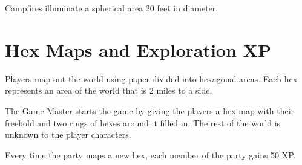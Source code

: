 \begin{multicols}{2}
Campfires illuminate a spherical area 20 feet in diameter.

\section{Hex Maps and Exploration XP}

Players map out the world using paper divided into hexagonal areas. Each hex
represents an area of the world that is 2 miles to a side.

The Game Master starts the game by giving the players a hex map with their freehold
and two rings of hexes around it filled in. The rest of the world is unknown to
the player characters.

Every time the party maps a new hex, each member of the party gains 50 XP.

\end{multicols}
